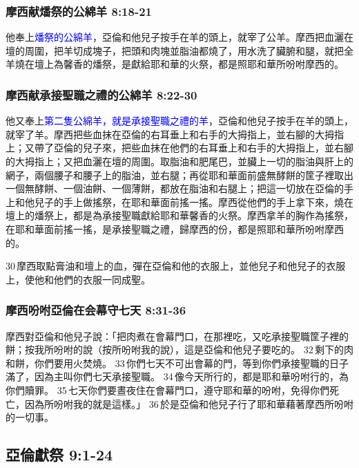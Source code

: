 \subsubsection{摩西献燔祭的公綿羊 8:18-21}
他奉上\textcolor{blue}{燔祭的公綿羊}，亞倫和他兒子按手在羊的頭上，就宰了公羊。摩西把血灑在壇的周圍，把羊切成塊子，把頭和肉塊並脂油都燒了，用水洗了臟腑和腿，就把全羊燒在壇上為馨香的燔祭，是獻給耶和華的火祭，都是照耶和華所吩咐摩西的。

\subsubsection{摩西献承接聖職之禮的公綿羊 8:22-30}
他又奉上\textcolor{blue}{第二隻公綿羊，就是承接聖職之禮的羊}，亞倫和他兒子按手在羊的頭上，就宰了羊。摩西把些血抹在亞倫的右耳垂上和右手的大拇指上，並右腳的大拇指上；又帶了亞倫的兒子來，把些血抹在他們的右耳垂上和右手的大拇指上，並右腳的大拇指上；又把血灑在壇的周圍。取脂油和肥尾巴，並臟上一切的脂油與肝上的網子，兩個腰子和腰子上的脂油，並右腿；再從耶和華面前盛無酵餅的筐子裡取出一個無酵餅、一個油餅、一個薄餅，都放在脂油和右腿上；把這一切放在亞倫的手上和他兒子的手上做搖祭，在耶和華面前搖一搖。摩西從他們的手上拿下來，燒在壇上的燔祭上，都是為承接聖職獻給耶和華馨香的火祭。摩西拿羊的胸作為搖祭，在耶和華面前搖一搖，是承接聖職之禮，歸摩西的份，都是照耶和華所吩咐摩西的。

30 摩西取點膏油和壇上的血，彈在亞倫和他的衣服上，並他兒子和他兒子的衣服上，使他和他們的衣服一同成聖。


\subsubsection{摩西吩咐亞倫在会幕守七天 8:31-36}
摩西對亞倫和他兒子說：「把肉煮在會幕門口，在那裡吃，又吃承接聖職筐子裡的餅；按我所吩咐的說（按所吩咐我的說），這是亞倫和他兒子要吃的。 32 剩下的肉和餅，你們要用火焚燒。 33 你們七天不可出會幕的門，等到你們承接聖職的日子滿了，因為主叫你們七天承接聖職。 34 像今天所行的，都是耶和華吩咐行的，為你們贖罪。 35 七天你們要晝夜住在會幕門口，遵守耶和華的吩咐，免得你們死亡，因為所吩咐我的就是這樣。」 36 於是亞倫和他兒子行了耶和華藉著摩西所吩咐的一切事。


\subsection{亞倫獻祭 9:1-24}




